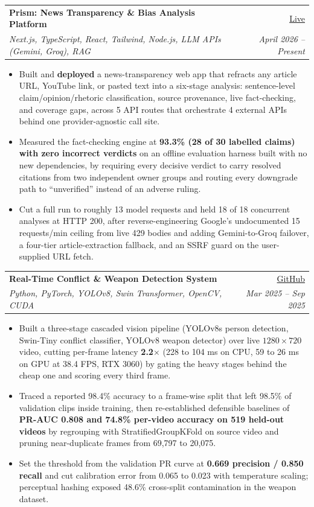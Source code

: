 \documentclass[letterpaper,11pt]{article}
\makeatletter
\newcommand{\bulletsep}{2pt}  %
\newcommand{\resumeEntry}[4]{%
  \vspace{-2.5pt}\item
    \begin{tabular*}{0.98\textwidth}[t]{l@{\extracolsep{\fill}}r}
      \textbf{#1} & #3 \\
      \textit{\small #2} & \textit{\small #4} \\
    \end{tabular*}\vspace{-2pt}
}
\newcommand{\resumeItem}[1]{\item\small{#1}}
\newcommand{\resumeItemListStart}{\begin{itemize}[leftmargin=0.28in, topsep=2pt, itemsep=\bulletsep]}
\newcommand{\resumeItemListEnd}{\end{itemize}}
\newcommand{\prismlive}{https://www.prismrefractor.in/}
\newcommand{\survgit}{https://github.com/YdvPrashant/Ultimate_Conflict_Detection}
\makeatother
\begin{document}
  \resumeEntry
    {Prism: News Transparency \& Bias Analysis Platform}
    {Next.js, TypeScript, React, Tailwind, Node.js, LLM APIs (Gemini, Groq), RAG}
    {\href{\prismlive}{Live}}
    {April 2026 -- Present}
    \resumeItemListStart
      \resumeItem{Built and \textbf{deployed} a news-transparency web app that refracts any article URL, YouTube link, or pasted text into a six-stage analysis: sentence-level claim/opinion/rhetoric classification, source provenance, live fact-checking, and coverage gaps, across 5 API routes that orchestrate 4 external APIs behind one provider-agnostic call site.}
      \resumeItem{Measured the fact-checking engine at \textbf{93.3\% (28 of 30 labelled claims) with zero incorrect verdicts} on an offline evaluation harness built with no new dependencies, by requiring every decisive verdict to carry resolved citations from two independent owner groups and routing every downgrade path to ``unverified'' instead of an adverse ruling.}
      \resumeItem{Cut a full run to roughly 13 model requests and held 18 of 18 concurrent analyses at HTTP 200, after reverse-engineering Google's undocumented 15 requests/min ceiling from live 429 bodies and adding Gemini-to-Groq failover, a four-tier article-extraction fallback, and an SSRF guard on the user-supplied URL fetch.}
    \resumeItemListEnd

  \resumeEntry
    {Real-Time Conflict \& Weapon Detection System}
    {Python, PyTorch, YOLOv8, Swin Transformer, OpenCV, CUDA}
    {\href{\survgit}{GitHub}}
    {Mar 2025 -- Sep 2025}
    \resumeItemListStart
      \resumeItem{Built a three-stage cascaded vision pipeline (YOLOv8s person detection, Swin-Tiny conflict classifier, YOLOv8 weapon detector) over live $1280\times720$ video, cutting per-frame latency \textbf{2.2$\times$} (228 to 104 ms on CPU, 59 to 26 ms on GPU at 38.4 FPS, RTX 3060) by gating the heavy stages behind the cheap one and scoring every third frame.}
      \resumeItem{Traced a reported 98.4\% accuracy to a frame-wise split that left 98.5\% of validation clips inside training, then re-established defensible baselines of \textbf{PR-AUC 0.808 and 74.8\% per-video accuracy on 519 held-out videos} by regrouping with StratifiedGroupKFold on source video and pruning near-duplicate frames from 69,797 to 20,075.}
      \resumeItem{Set the threshold from the validation PR curve at \textbf{0.669 precision / 0.850 recall} and cut calibration error from 0.065 to 0.023 with temperature scaling; perceptual hashing exposed 48.6\% cross-split contamination in the weapon dataset.}
    \resumeItemListEnd
\end{document}
